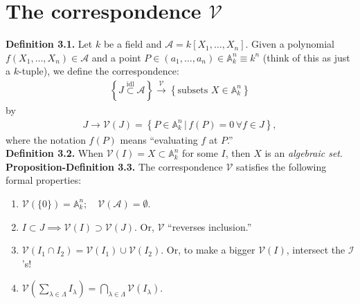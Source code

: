 \documentclass[12pt]{article}
\newcommand{\lp}{\left(}
\newcommand{\rp}{\right)}
\newcommand{\lc}{\left\{}
\newcommand{\rc}{\right\}}
\begin{document}
\newpage

\section{The correspondence $\mathcal{V}$}

\textbf{Definition 3.1.} Let $k$ be a field and $\mathcal{A} = k[X_1,\dots,X_n]$. Given a polynomial $f(X_1,\dots,X_n) \in \mathcal{A}$ and a point $P \in (a_1,\dots,a_n) \in \mathbb{A}^n_{k} \equiv k^n$ (think of this as just a $k$-tuple), we define the correspondence:
\begin{align*}
\lc {J} \overset{\text{idl}}{\subset} \mathcal{A} \rc \xrightarrow{\mathcal{V}} \lc \text{subsets } X \in \mathbb{A}^n_k \rc
\end{align*}
by 
\begin{align*}
J \to \mathcal{V}(J) = \lc P\in \mathbb{A}^n_k \,\vert\, f(P) = 0\,\forall f\in {J} \rc,
\end{align*}
where the notation $f(P)$ means ``evaluating $f$ at $P$.'' \\


\noindent \textbf{Definition 3.2.} When $\mathcal{V}({I}) = X \subset \mathbb{A}^n_k$ for some ${I}$, then $X$ is an \textit{algebraic set}. \\


\noindent \textbf{Proposition-Definition 3.3.} The correspondence $\mathcal{V}$ satisfies the following formal properties:
\begin{enumerate}
	\item $\mathcal{V}(\{0\}) = \mathbb{A}^n_k; \quad \mathcal{V}(\mathcal{A}) = \emptyset$.
	\item $I \subset J \implies \mathcal{V}(I) \supset \mathcal{V}(J)$. Or, $\mathcal{V}$ ``reverses inclusion.''
	\item $\mathcal{V}(I_1 \cap I_2) = \mathcal{V}(I_1) \cup \mathcal{V}(I_2) $. Or, to make a bigger $\mathcal{V}(I)$, intersect the $\mathcal{I}$'s!
	\item $\mathcal{V}\lp \sum_{\lambda\in \Lambda}I_\lambda \rp = \bigcap_{\lambda\in \Lambda} \mathcal{V}(I_\lambda)$. 
\end{enumerate}
\end{document}
